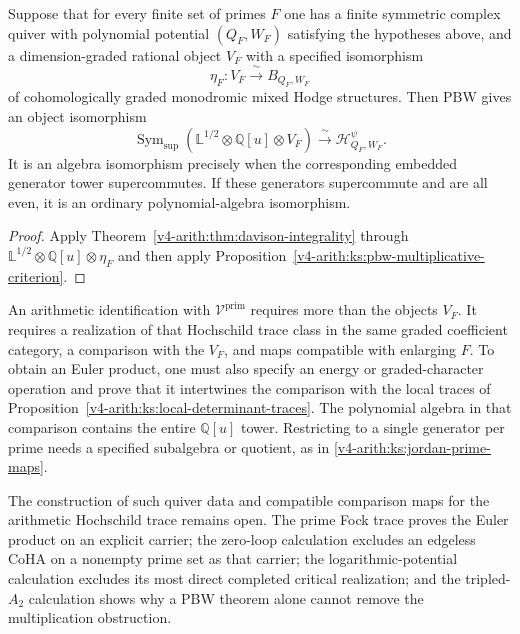 \begin{proposition}
\label{v4-arith:thm:arithmetic-CoHA-conjectural}
\ClaimStatusConditional{}
Suppose that for every finite set of primes $F$ one has a finite
symmetric complex quiver with polynomial potential $(Q_F,W_F)$
satisfying the hypotheses above, and a dimension-graded rational
object $V_F$ with a specified isomorphism
\[
 \eta_F:V_F\xrightarrow{\ \sim\ }B_{Q_F,W_F}
\]
of cohomologically graded monodromic mixed Hodge structures.
Then PBW gives an object isomorphism
\[
 \operatorname{Sym}_{\mathrm{sup}}
    (\mathbb L^{1/2}\otimes\mathbb Q[u]\otimes V_F)
       \xrightarrow{\ \sim\ }\mathcal H_{Q_F,W_F}^{\psi}.
\]
It is an algebra isomorphism precisely when the corresponding
embedded generator tower supercommutes. If these generators
supercommute and are all even, it is an ordinary polynomial-algebra
isomorphism.
\end{proposition}

\begin{proof}
Apply Theorem~\ref{v4-arith:thm:davison-integrality} through
$\mathbb L^{1/2}\otimes\mathbb Q[u]\otimes\eta_F$ and then apply
Proposition~\ref{v4-arith:ks:pbw-multiplicative-criterion}.
\end{proof}

An arithmetic identification with $\mathcal V^{\mathrm{prim}}$
requires more than the objects $V_F$. It requires a realization of
that Hochschild trace class in the same graded coefficient category,
a comparison with the $V_F$, and maps compatible with enlarging $F$.
To obtain an Euler product, one must also specify an energy or
graded-character operation and prove that it intertwines the
comparison with the local traces of
Proposition~\ref{v4-arith:ks:local-determinant-traces}.
The polynomial algebra in that comparison contains the entire
$\mathbb Q[u]$ tower. Restricting to a single generator per prime
needs a specified subalgebra or quotient, as in
\eqref{v4-arith:ks:jordan-prime-maps}.

The construction of such quiver data and compatible comparison maps
for the arithmetic Hochschild trace remains open. The prime Fock
trace proves the Euler product on an explicit carrier; the
zero-loop calculation excludes an edgeless CoHA on a nonempty prime
set as that carrier;
the logarithmic-potential calculation excludes its most direct
completed critical realization; and the tripled-$A_2$ calculation
shows why a PBW theorem alone cannot remove the multiplication
obstruction.
